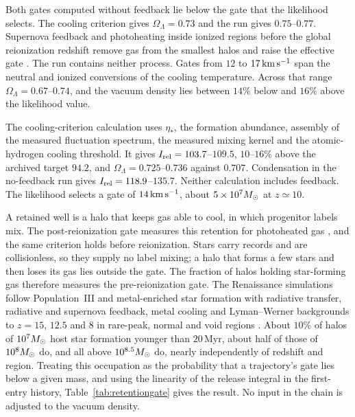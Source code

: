 Both gates computed without feedback lie below the gate that the
likelihood selects. The cooling criterion gives $\Omega_\Lambda=0.73$ and
the run gives $0.75$--$0.77$. Supernova feedback and photoheating inside
ionized regions before the global reionization redshift remove gas from
the smallest halos and raise the effective gate
\cite{thoul96,okamoto08}. The run contains neither process. Gates from
$12$ to $17\,\mathrm{km\,s^{-1}}$ span the neutral and ionized conversions of the
cooling temperature. Across that range $\Omega_\Lambda=0.67$--$0.74$, and
the vacuum density lies between $14\%$ below and $16\%$ above the
likelihood value.

The cooling-criterion calculation uses $\eta_*$, the formation abundance,
assembly of the measured fluctuation spectrum, the measured mixing kernel
and the atomic-hydrogen cooling threshold. It gives
$I_{\rm rel}=103.7$--$109.5$, $10$--$16\%$ above the archived target
$94.2$, and $\Omega_\Lambda=0.725$--$0.736$ against $0.707$. Condensation
in the no-feedback run gives $I_{\rm rel}=118.9$--$135.7$. Neither
calculation includes feedback. The likelihood selects a gate of
$14\,\mathrm{km\,s^{-1}}$, about $5\times10^7M_\odot$ at $z\simeq10$.

A retained well is a halo that keeps gas able to cool, in which
progenitor labels mix. The post-reionization gate measures this retention
for photoheated gas \cite{okamoto08}, and the same criterion holds before
reionization. Stars carry records and are collisionless, so they supply
no label mixing; a halo that forms a few stars and then loses its gas
lies outside the gate. The fraction of halos holding star-forming gas
therefore measures the pre-reionization gate. The Renaissance simulations
follow Population~III and metal-enriched star formation with radiative
transfer, radiative and supernova feedback, metal cooling and
Lyman--Werner backgrounds to $z=15$, $12.5$ and $8$ in rare-peak, normal
and void regions \cite{oshea15,xu16}. About $10\%$ of halos of
$10^7M_\odot$ host star formation younger than $20\,$Myr, about half of
those of $10^8M_\odot$ do, and all above $10^{8.5}M_\odot$ do, nearly
independently of redshift and region. Treating this occupation as the
probability that a trajectory's gate lies below a given mass, and using
the linearity of the release integral in the first-entry history,
Table~\ref{tab:retentiongate} gives the result. No input in the chain is
adjusted to the vacuum density.

